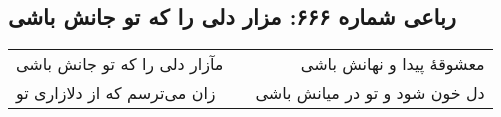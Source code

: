 \begin{center}
\section*{رباعی شماره ۶۶۶: مزار دلی را که تو جانش باشی}
\label{sec:sh666}
\begin{longtable}{l p{0.5cm} r}
مآزار دلی را که تو جانش باشی
&&
معشوقهٔ پیدا و نهانش باشی
\\
زان می‌ترسم که از دلازاری تو
&&
دل خون شود و تو در میانش باشی
\\
\end{longtable}
\end{center}
